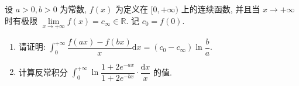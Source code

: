 \begin{solution}
\begin{enumerate}


\end{enumerate}
\end{solution}


\begin{question}[points = 10]
设 $a > 0, b > 0$ 为常数, $f(x)$ 为定义在 $[0, + \infty)$ 上的连续函数, 并且当 $x \to +\infty$ 时有极限 $\lim\limits_{x \to +\infty} f(x) = c_{\infty} \in \mathbb{R}.$ 记 $c_0 = f(0).$
\begin{enumerate}
\item 请证明: $\displaystyle \int_0^{+\infty} \dfrac{f(ax) - f(bx)}{x} \mathrm{d}x = (c_0 - c_{\infty}) \ln \dfrac{b}{a}.$
\item 计算反常积分 $\displaystyle \int_0^{+\infty} \ln \dfrac{1+2e^{-ax}}{1+2e^{-bx}} \cdot \dfrac{\mathrm{d}x}{x}$ 的值.
\end{enumerate}

\end{question}

